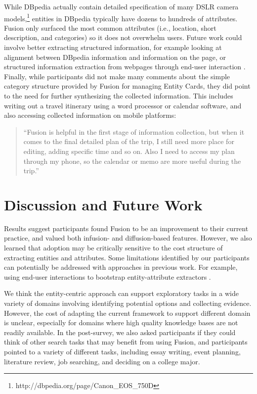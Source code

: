 \noindent While DBpedia actually contain detailed specification of many DSLR camera models,\footnote{http://dbpedia.org/page/Canon\_EOS\_750D} entities in DBpedia typically have dozens to hundreds of attributes. Fusion only surfaced the most common attributes (i.e., location, short description, and categories) so it does not overwhelm users. Future work could involve better extracting structured information, for example looking at alignment between DBpedia information and information on the page, or structured information extraction from webpages through end-user interaction \cite{thresher,bier2006entity}.
Finally, while participants did not make many comments about the simple category structure provided by Fusion for managing Entity Cards, they did point to the need for further synthesizing the collected information. This includes writing out a travel itinerary using a word processor or calendar software, and also accessing collected information on mobile platforms:

\begin{quote}
``Fusion is helpful in the first stage of information collection, but when it comes to the final detailed plan of the trip, I still need more place for editing, adding specific time and so on. Also I need to access my plan through my phone, so the calendar or memo are more useful during the trip.''
\end{quote}


\section{Discussion and Future Work}


Results suggest participants found Fusion to be an improvement to their current practice, and valued both infusion- and diffusion-based features. However, we also learned that adoption may be critically sensitive to the cost structure of extracting entities and attributes. Some limitations identified by our participants can potentially be addressed with approaches in previous work. For example, using end-user interactions to bootstrap entity-attribute extractors \cite{thresher,bier2006entity}.

We think the entity-centric approach can support exploratory tasks in a wide variety of domains involving identifying potential options and collecting evidence. However, the cost of adapting the current framework to support different domain is unclear, especially for domains where high quality knowledge bases are not readily available. In the post-survey, we also asked participants if they could think of other search tasks that may benefit from using Fusion, and participants pointed to a variety of different tasks, including essay writing, event planning, literature review, job searching, and deciding on a college major. 

